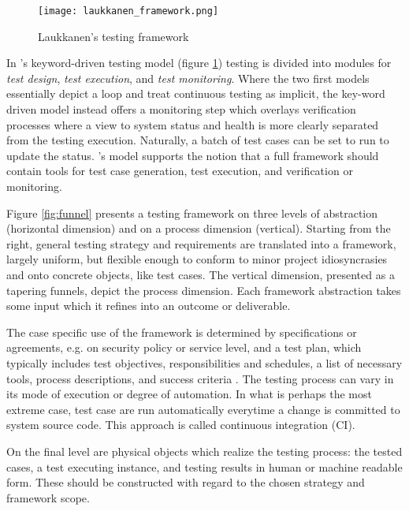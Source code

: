 \documentclass[12pt,a4paper,oneside,pdftex]{report}
\begin{document}
{\begin{figure}[H]
  \begin{center}
    \texttt{[image: laukkanen\_framework.png]}
    \caption{Laukkanen's testing framework \citep{laukkanen2006data}}
    \label{fig:laukkanen} 
  \end{center}
\end{figure}

In \citeauthor{laukkanen2006data}'s \citeyearpar{laukkanen2005data} keyword-driven testing model (figure \ref{fig:laukkanen}) testing is divided into modules for \emph{test design}, \emph{test execution}, and \emph{test monitoring}. Where the two first models essentially depict a loop and treat continuous testing as implicit, the key-word driven model instead offers a monitoring step which overlays verification processes where a view to system status and health is more clearly separated from the testing execution. Naturally, a batch of test cases can be set to run to update the status. \citeauthor{laukkanen2006data}'s \citeyearpar{laukkanen2005data} model supports the notion that a full framework should contain tools for test case generation, test execution, and verification or monitoring.

Figure \ref{fig:funnel} presents a testing framework on three levels of abstraction (horizontal dimension) and on a process dimension (vertical). Starting from the right, general testing strategy and requirements are translated into a framework, largely uniform, but flexible enough to conform to minor project idiosyncrasies and onto concrete objects, like test cases. The vertical dimension, presented as a tapering funnels, depict the process dimension. Each framework abstraction takes some input which it refines into an outcome or deliverable.

The case specific use of the framework is determined by specifications or agreements, e.g. on security policy or service level, and a test plan, which typically includes test objectives, responsibilities and schedules, a list of necessary tools, process descriptions, and success criteria \citep{myers1976software}. The testing process can vary in its mode of execution or degree of automation. In what is perhaps the most extreme case, test case are run automatically everytime a change is committed to system source code. This approach is called continuous integration (CI). 

On the final level are physical objects which realize the testing process: the tested cases, a test executing instance, and testing results in human or machine readable form. These should be constructed with regard to the chosen strategy and framework scope. 

}
\end{document}
